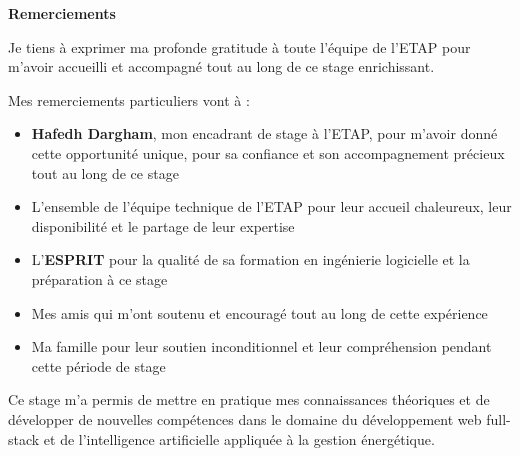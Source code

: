 \documentclass[12pt,a4paper]{article}
\begin{document}
\begin{center}
\vspace*{3cm}

{\Huge\bfseries Remerciements\par}

\vspace{2cm}

\begin{minipage}{0.8\textwidth}
Je tiens à exprimer ma profonde gratitude à toute l'équipe de l'ETAP pour m'avoir accueilli et accompagné tout au long de ce stage enrichissant. 

\vspace{1cm}

Mes remerciements particuliers vont à :
\begin{itemize}
    \item \textbf{Hafedh Dargham}, mon encadrant de stage à l'ETAP, pour m'avoir donné cette opportunité unique, pour sa confiance et son accompagnement précieux tout au long de ce stage
    \item L'ensemble de l'équipe technique de l'ETAP pour leur accueil chaleureux, leur disponibilité et le partage de leur expertise
    \item L'\textbf{ESPRIT} pour la qualité de sa formation en ingénierie logicielle et la préparation à ce stage
    \item Mes amis qui m'ont soutenu et encouragé tout au long de cette expérience
    \item Ma famille pour leur soutien inconditionnel et leur compréhension pendant cette période de stage
\end{itemize}

\vspace{1cm}

Ce stage m'a permis de mettre en pratique mes connaissances théoriques et de développer de nouvelles compétences dans le domaine du développement web full-stack et de l'intelligence artificielle appliquée à la gestion énergétique.
\end{minipage}
\end{center}

\newpage
\end{document}
